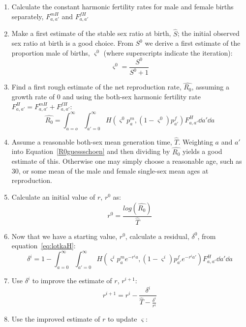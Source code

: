 \begin{enumerate}
  \item Calculate the constant harmonic fertility rates for male and female
  births separately, $F_{a,a'}^{mH}$ and $F_{a,a'}^{fH}$
  \item Make a first estimate of the stable sex ratio at birth, $\hat{S}$; the
  initial observed sex ratio at birth is a good choice. From $S^0$ we derive a
  first estimate of the proportion male of births, $\varsigma^0$ (where
  superscripts indicate the iteration):
  \begin{equation}
  \varsigma^0 = \frac{S^0}{S^0+1}
  \end{equation}
  \item Find a first rough estimate of the net reproduction rate,
  $\widehat{R_0}$, assuming a growth rate of 0 and using the both-sex
  harmonic fertility rate $F_{a,a'}^{H} = F_{a,a'}^{mH} + F_{a,a'}^{fH}$:
  \begin{equation}
  \label{R0guessschoen}
  \widehat{R_0} = \int_{a=o}^\infty \int_{a'=0}^\infty H(\varsigma^0 p_a^m,
  (1-\varsigma^0)p_{a'}^f) F_{a,a'}^{H} \dd a' \dd a
  \end{equation}
  \item Assume a reasonable both-sex mean generation time, $\widehat{T}$.
  Weighting $a$ and $a'$ into Equation~\eqref{R0guessschoen} and then dividing
  by $\widehat{R_0}$ yields a good estimate of this. Otherwise one may simply
  choose a reasonable age, such as 30, or some mean of the male and female
  single-sex mean ages at reproduction.
  \item Calculate an initial value of $r$, $r^0$ as:
  \begin{equation}
  r^0 = \frac{log(\widehat{R_0})}{\widehat{T}}
  \end{equation}
  \item Now that we have a starting value, $r^0$, calculate a residual,
  $\delta^0$, from equation~\eqref{eq:lotkaH}:
  \begin{equation}
  \delta^i = 1 - \int _{a=0}^\infty \int _{a'=0}^\infty H(\varsigma^i p_a^m
  e^{-r^ia}, (1-\varsigma^i)p_{a'}^fe^{-r^ia'}) F_{a,a'}^H \dd a' \dd a
  \end{equation}
  \item Use $\delta^i$ to improve the estimate of $r$, $r^{i+1}$:
  \begin{equation}
  r^{i+1} = r^i - \frac{\delta^i}{\widehat{T} - \frac{\delta^i}{r^i}}
  \end{equation}
  \item Use the improved estimate of $r$ to update $\varsigma$:

\end{enumerate}
